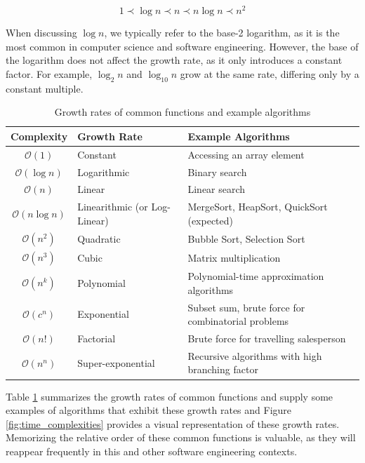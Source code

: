 \[
1 \prec \log n \prec n \prec n \log n \prec n^2
\]

\begin{remark}
    When discussing $\log n$, we typically refer to the base-2 logarithm, as it is the most common in computer science and software engineering. However, the base of the logarithm does not affect the growth rate, as it only introduces a constant factor. For example, $\log_2 n$ and $\log_{10} n$ grow at the same rate, differing only by a constant multiple.
\end{remark}

\begin{table}[htbp]
    \centering
    \renewcommand{\arraystretch}{1.4}
    \begin{tabular}{|c|l|l|}
        \hline
        \textbf{Complexity} & \textbf{Growth Rate} & \textbf{Example Algorithms} \\
        \hline
        \( \mathcal{O}(1) \) & Constant & Accessing an array element \\
        \hline
        \( \mathcal{O}(\log n) \) & Logarithmic & Binary search \\
        \hline
        \( \mathcal{O}(n) \) & Linear & Linear search \\
        \hline
        \( \mathcal{O}(n \log n) \) & Linearithmic (or Log-Linear) & MergeSort, HeapSort, QuickSort (expected) \\
        \hline
        \( \mathcal{O}(n^2) \) & Quadratic & Bubble Sort, Selection Sort \\
        \hline
        \( \mathcal{O}(n^3) \) & Cubic & Matrix multiplication \\
        \hline
        \( \mathcal{O}(n^k) \) & Polynomial & Polynomial-time approximation algorithms \\
        \hline
        \( \mathcal{O}(c^n) \) & Exponential & Subset sum, brute force for combinatorial problems \\
        \hline
        \( \mathcal{O}(n!) \) & Factorial & Brute force for travelling salesperson \\
        \hline
        \( \mathcal{O}(n^n) \) & Super-exponential & Recursive algorithms with high branching factor \\
        \hline
    \end{tabular}
    \caption{Growth rates of common functions and example algorithms}
    \label{tab:growth_rates}
\end{table}


Table \ref{tab:growth_rates} summarizes the growth rates of common functions and supply some examples of algorithms that exhibit these growth rates and Figure \ref{fig:time_complexities} provides a visual representation of these growth rates. Memorizing the relative order of these common functions is valuable, as they will reappear frequently in this and other software engineering contexts.

